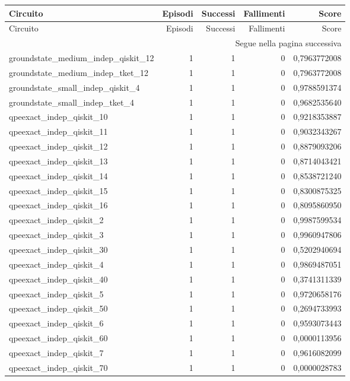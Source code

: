 \begin{longtable}{lrrrr}
\toprule
Circuito & Episodi & Successi & Fallimenti & Score \\
\midrule
\endfirsthead
\toprule
Circuito & Episodi & Successi & Fallimenti & Score \\
\midrule\endhead
\midrule\multicolumn{5}{r}{\footnotesize Segue nella pagina successiva}\\
\endfoot
\bottomrule\endlastfoot
groundstate\_medium\_indep\_qiskit\_12 & 1 & 1 & 0 & 0,7963772008 \\
groundstate\_medium\_indep\_tket\_12 & 1 & 1 & 0 & 0,7963772008 \\
groundstate\_small\_indep\_qiskit\_4 & 1 & 1 & 0 & 0,9788591374 \\
groundstate\_small\_indep\_tket\_4 & 1 & 1 & 0 & 0,9682535640 \\
qpeexact\_indep\_qiskit\_10 & 1 & 1 & 0 & 0,9218353887 \\
qpeexact\_indep\_qiskit\_11 & 1 & 1 & 0 & 0,9032343267 \\
qpeexact\_indep\_qiskit\_12 & 1 & 1 & 0 & 0,8879093206 \\
qpeexact\_indep\_qiskit\_13 & 1 & 1 & 0 & 0,8714043421 \\
qpeexact\_indep\_qiskit\_14 & 1 & 1 & 0 & 0,8538721240 \\
qpeexact\_indep\_qiskit\_15 & 1 & 1 & 0 & 0,8300875325 \\
qpeexact\_indep\_qiskit\_16 & 1 & 1 & 0 & 0,8095860950 \\
qpeexact\_indep\_qiskit\_2 & 1 & 1 & 0 & 0,9987599534 \\
qpeexact\_indep\_qiskit\_3 & 1 & 1 & 0 & 0,9960947806 \\
qpeexact\_indep\_qiskit\_30 & 1 & 1 & 0 & 0,5202940694 \\
qpeexact\_indep\_qiskit\_4 & 1 & 1 & 0 & 0,9869487051 \\
qpeexact\_indep\_qiskit\_40 & 1 & 1 & 0 & 0,3741311339 \\
qpeexact\_indep\_qiskit\_5 & 1 & 1 & 0 & 0,9720658176 \\
qpeexact\_indep\_qiskit\_50 & 1 & 1 & 0 & 0,2694733993 \\
qpeexact\_indep\_qiskit\_6 & 1 & 1 & 0 & 0,9593073443 \\
qpeexact\_indep\_qiskit\_60 & 1 & 1 & 0 & 0,0000113956 \\
qpeexact\_indep\_qiskit\_7 & 1 & 1 & 0 & 0,9616082099 \\
qpeexact\_indep\_qiskit\_70 & 1 & 1 & 0 & 0,0000028783 \\

\end{longtable}
